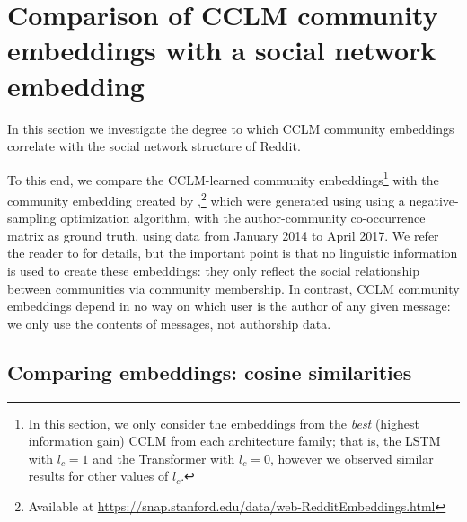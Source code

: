 \documentclass[11pt]{article}
\begin{document}
\section{Comparison of CCLM community embeddings with a social network embedding}\label{sec:embedding-analysis}



In this section we investigate the degree to which CCLM community
embeddings correlate with the social network structure of Reddit.

To this end, we compare the CCLM-learned community
embeddings\footnote{
  In this section, we only consider the embeddings from 
  the \emph{best} (highest information gain) CCLM from each architecture family; 
  that is, the LSTM with $l_c=1$ and the Transformer with $l_c=0$, however we
  observed similar results for other values of $l_c$.}
with the community embedding created by \citet{Kumar2018},\footnote{
  Available at \url{https://snap.stanford.edu/data/web-RedditEmbeddings.html}}
which were generated using using a negative-sampling optimization
algorithm, with the author-community co-occurrence matrix as ground
truth, using data from January 2014 to April 2017.
We refer the reader
to \citet{Kumar2018}
for details, but the important point is that no linguistic
information is used to create these embeddings: they only reflect the social
relationship between communities via community membership. 
In contrast, CCLM community embeddings depend in no
way on which user is the author of any given message: we only use the
contents of messages, not authorship data.
%

\subsection{Comparing embeddings: cosine similarities}
\label{sec:storytelling}

\newcommand{\pairwisecossimbarplot}[1]{
    \nextgroupplot[ybar=0pt,
      bar width=0.25cm,
      xticklabels from table={floats/#1}{comms-label},
      enlargelimits=0.15,
      yticklabels={,,}
    ]
    \addplot[draw=violet,fill=violet!10] table [y=lstm-sim] {floats/#1};
    \addplot[draw=teal,fill=teal!10] table [y=transformer-sim] {floats/#1};
    \addplot[draw=red,fill=red!10] table [y=social-sim] {floats/#1};
}
\end{document}
